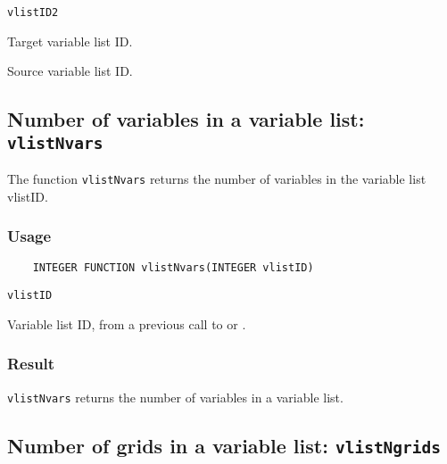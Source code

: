 \hspace*{4mm}\begin{minipage}[]{15cm}
\begin{deflist}{\tt vlistID2\ }
\item[{\tt vlistID2}]
Target variable list ID.
\item[{\tt vlistID1}]
Source variable list ID.

\end{deflist}
\end{minipage}


\subsection{Number of variables in a variable list: {\tt vlistNvars}}
\label{vlistNvars}

The function {\tt vlistNvars} returns the number of variables in the variable list vlistID.

\subsubsection*{Usage}

\begin{verbatim}
    INTEGER FUNCTION vlistNvars(INTEGER vlistID)
\end{verbatim}

\hspace*{4mm}\begin{minipage}[]{15cm}
\begin{deflist}{\tt vlistID\ }
\item[{\tt vlistID}]
Variable list ID, from a previous call to {} or {}.

\end{deflist}
\end{minipage}

\subsubsection*{Result}

{\tt vlistNvars} returns the number of variables in a variable list.



\subsection{Number of grids in a variable list: {\tt vlistNgrids}}
\label{vlistNgrids}

